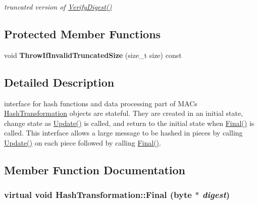 \begin{DoxyCompactItemize}
\begin{DoxyCompactList}\small\item\em truncated version of \hyperlink{class_hash_transformation_acad96df68e70d922683e5063057130b2}{VerifyDigest()} \item\end{DoxyCompactList}\end{DoxyCompactItemize}
\subsection*{Protected Member Functions}
\begin{DoxyCompactItemize}
\item 
\hypertarget{class_hash_transformation_a584846215692150d99d63f8b7ccd58d8}{
void {\bfseries ThrowIfInvalidTruncatedSize} (size\_\-t size) const }
\label{class_hash_transformation_a584846215692150d99d63f8b7ccd58d8}

\end{DoxyCompactItemize}


\subsection{Detailed Description}
interface for hash functions and data processing part of MACs \hyperlink{class_hash_transformation}{HashTransformation} objects are stateful. They are created in an initial state, change state as \hyperlink{class_hash_transformation_aafabefaf445b65d3ba0d8e1c0294afe5}{Update()} is called, and return to the initial state when \hyperlink{class_hash_transformation_aa0b8c7a110d8968268fd02ec32b9a8e8}{Final()} is called. This interface allows a large message to be hashed in pieces by calling \hyperlink{class_hash_transformation_aafabefaf445b65d3ba0d8e1c0294afe5}{Update()} on each piece followed by calling \hyperlink{class_hash_transformation_aa0b8c7a110d8968268fd02ec32b9a8e8}{Final()}. 

\subsection{Member Function Documentation}
\hypertarget{class_hash_transformation_aa0b8c7a110d8968268fd02ec32b9a8e8}{
\subsubsection[{Final}]{\setlength{\rightskip}{0pt plus 5cm}virtual void HashTransformation::Final (byte $\ast$ {\em digest})}}
\label{class_hash_transformation_aa0b8c7a110d8968268fd02ec32b9a8e8}


